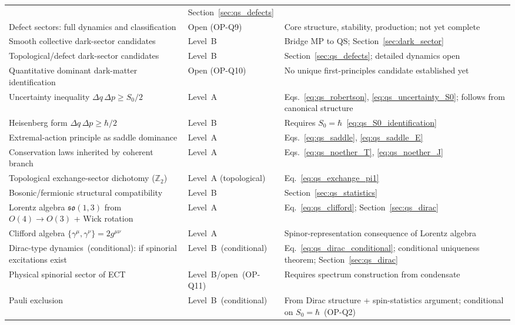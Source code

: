 \begin{table}[h]
\begin{tabular}{p{6.0cm}p{2.4cm}p{4.5cm}}
  & Section~\ref{sec:qs_defects} \\
Defect sectors: full dynamics and classification
  & Open (OP-Q9)
  & Core structure, stability, production; not yet complete \\
Smooth collective dark-sector candidates
  & Level~B
  & Bridge MP to QS; Section~\ref{sec:dark_sector} \\
Topological/defect dark-sector candidates
  & Level~B
  & Section~\ref{sec:qs_defects}; detailed dynamics open \\
Quantitative dominant dark-matter identification
  & Open (OP-Q10)
  & No unique first-principles candidate established yet \\
Uncertainty inequality $\Delta q\,\Delta p\ge S_0/2$
  & Level~A
  & Eqs.~\eqref{eq:qs_robertson}, \eqref{eq:qs_uncertainty_S0};
    follows from canonical structure \\
Heisenberg form $\Delta q\,\Delta p\ge\hbar/2$
  & Level~B
  & Requires $S_0=\hbar$~\eqref{eq:qs_S0_identification} \\
Extremal-action principle as saddle dominance
  & Level~A
  & Eqs.~\eqref{eq:qs_saddle}, \eqref{eq:qs_saddle_E} \\
Conservation laws inherited by coherent branch
  & Level~A
  & Eqs.~\eqref{eq:qs_noether_T}, \eqref{eq:qs_noether_J} \\
Topological exchange-sector dichotomy ($\mathbb{Z}_2$)
  & Level~A (topological)
  & Eq.~\eqref{eq:qs_exchange_pi1} \\
Bosonic/fermionic structural compatibility
  & Level~B
  & Section~\ref{sec:qs_statistics} \\
Lorentz algebra $\mathfrak{so}(1,3)$ from $O(4)\to O(3)$ + Wick rotation
  & Level~A
  & Eq.~\eqref{eq:qs_clifford}; Section~\ref{sec:qs_dirac} \\
Clifford algebra $\{\gamma^\mu,\gamma^\nu\}=2g^{\mu\nu}$
  & Level~A
  & Spinor-representation consequence of Lorentz algebra \\
Dirac-type dynamics~(conditional): if spinorial excitations exist
  & Level~B~(conditional)
  & Eq.~\eqref{eq:qs_dirac_conditional};
    conditional uniqueness theorem; Section~\ref{sec:qs_dirac} \\
Physical spinorial sector of ECT
  & Level~B/open~(OP-Q11)
  & Requires spectrum construction from condensate \\
Pauli exclusion
  & Level~B~(conditional)
  & From Dirac structure + spin-statistics argument;
    conditional on $S_0=\hbar$~(OP-Q2) \\

\end{tabular}
\end{table}
